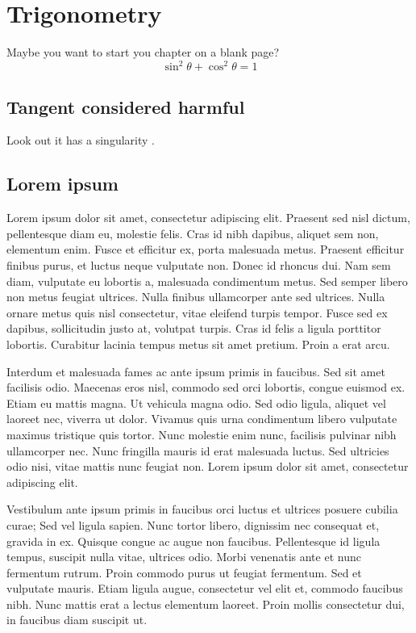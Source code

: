 \documentclass[class=memoir,crop=false]{standalone}
\begin{document}
\chapter{Trigonometry}
\newpage

Maybe you want to start you chapter on a blank page?
\[\sin^2 \theta + \cos^2\theta=1\]

\section{Tangent considered harmful}

Look out it has a singularity \cite{goto}.

\section{Lorem ipsum}

Lorem ipsum dolor sit amet, consectetur adipiscing elit. Praesent sed nisl dictum, pellentesque diam eu, molestie felis. Cras id nibh dapibus, aliquet sem non, elementum enim. Fusce et efficitur ex, porta malesuada metus. Praesent efficitur finibus purus, et luctus neque vulputate non. Donec id rhoncus dui. Nam sem diam, vulputate eu lobortis a, malesuada condimentum metus. Sed semper libero non metus feugiat ultrices. Nulla finibus ullamcorper ante sed ultrices. Nulla ornare metus quis nisl consectetur, vitae eleifend turpis tempor. Fusce sed ex dapibus, sollicitudin justo at, volutpat turpis. Cras id felis a ligula porttitor lobortis. Curabitur lacinia tempus metus sit amet pretium. Proin a erat arcu.

Interdum et malesuada fames ac ante ipsum primis in faucibus. Sed sit amet facilisis odio. Maecenas eros nisl, commodo sed orci lobortis, congue euismod ex. Etiam eu mattis magna. Ut vehicula magna odio. Sed odio ligula, aliquet vel laoreet nec, viverra ut dolor. Vivamus quis urna condimentum libero vulputate maximus tristique quis tortor. Nunc molestie enim nunc, facilisis pulvinar nibh ullamcorper nec. Nunc fringilla mauris id erat malesuada luctus. Sed ultricies odio nisi, vitae mattis nunc feugiat non. Lorem ipsum dolor sit amet, consectetur adipiscing elit.

Vestibulum ante ipsum primis in faucibus orci luctus et ultrices posuere cubilia curae; Sed vel ligula sapien. Nunc tortor libero, dignissim nec consequat et, gravida in ex. Quisque congue ac augue non faucibus. Pellentesque id ligula tempus, suscipit nulla vitae, ultrices odio. Morbi venenatis ante et nunc fermentum rutrum. Proin commodo purus ut feugiat fermentum. Sed et vulputate mauris. Etiam ligula augue, consectetur vel elit et, commodo faucibus nibh. Nunc mattis erat a lectus elementum laoreet. Proin mollis consectetur dui, in faucibus diam suscipit ut.
\end{document}
